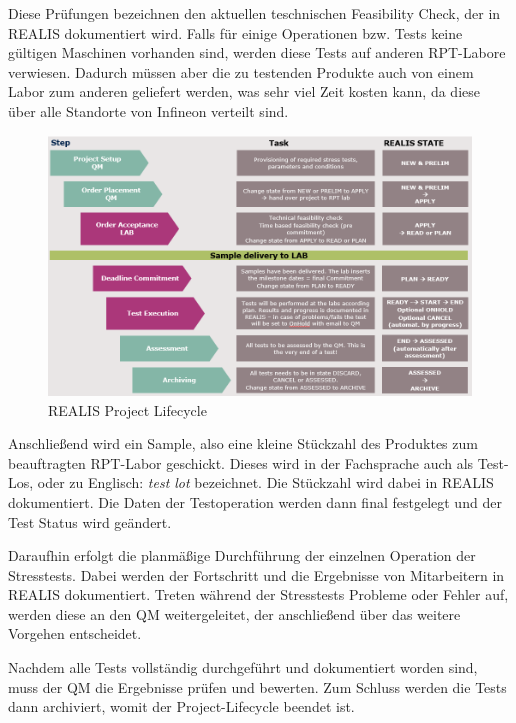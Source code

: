 Diese Prüfungen bezeichnen den aktuellen teschnischen Feasibility Check, der in \ac{REALIS} dokumentiert wird.
Falls für einige Operationen bzw. Tests keine gültigen Maschinen vorhanden sind, werden diese Tests auf anderen \ac{RPT}-Labore verwiesen. Dadurch müssen aber die zu testenden Produkte auch von einem Labor zum anderen geliefert werden, was sehr viel Zeit kosten kann, da diese über alle Standorte von Infineon verteilt sind.

\begin{figure}[!h]
    \centering
    \includegraphics[width=1\textwidth]{bilder/realis-project-lifecycle.png}
    \caption{REALIS Project Lifecycle}
    \label{fig:realis-project-lifecycle}
\end{figure}

Anschließend wird ein Sample, also eine kleine Stückzahl des Produktes zum beauftragten \ac{RPT}-Labor geschickt. Dieses wird in der Fachsprache auch als Test-Los, oder zu Englisch: \textit{test lot}
bezeichnet. Die Stückzahl wird dabei in \ac{REALIS} dokumentiert. Die  Daten der Testoperation werden dann final festgelegt und der Test Status wird geändert.

Daraufhin erfolgt die planmäßige Durchführung der einzelnen Operation der Stresstests. Dabei werden der Fortschritt und die Ergebnisse von Mitarbeitern in \ac{REALIS} dokumentiert. Treten während der Stresstests Probleme oder Fehler auf, werden diese an den \ac{QM} weitergeleitet, der anschließend über das weitere Vorgehen entscheidet.

Nachdem alle Tests vollständig durchgeführt und dokumentiert worden sind, muss der \ac{QM} die Ergebnisse prüfen und bewerten. Zum Schluss werden die Tests dann archiviert, womit der Project-Lifecycle beendet ist.

